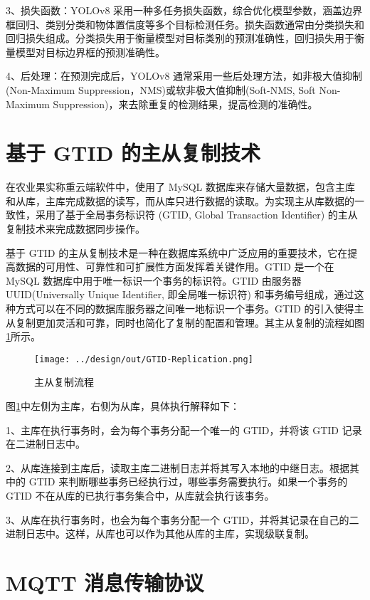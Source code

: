 3、损失函数：YOLOv8 采用一种多任务损失函数，综合优化模型参数，涵盖边界框回归、类别分类和物体置信度等多个目标检测任务\cite{Liu2023-yolov8}。损失函数通常由分类损失和回归损失组成。分类损失用于衡量模型对目标类别的预测准确性，回归损失用于衡量模型对目标边界框的预测准确性。

4、后处理：在预测完成后，YOLOv8 通常采用一些后处理方法，如非极大值抑制(Non-Maximum Suppression，NMS)或软非极大值抑制(Soft-NMS, Soft Non-Maximum Suppression)\cite{SuperYOLO8}，来去除重复的检测结果，提高检测的准确性。

\section{基于 GTID 的主从复制技术}\label{sec:gtid}

在农业果实称重云端软件中，使用了 MySQL 数据库来存储大量数据，包含主库和从库，主库完成数据的读写，而从库只进行数据的读取。为实现主从库数据的一致性，采用了基于全局事务标识符 (GTID, Global Transaction Identifier) 的主从复制技术来完成数据同步操作。

基于 GTID 的主从复制技术是一种在数据库系统中广泛应用的重要技术，它在提高数据的可用性、可靠性和可扩展性方面发挥着关键作用。GTID 是一个在 MySQL 数据库中用于唯一标识一个事务的标识符。GTID 由服务器 UUID(Universally Unique Identifier, 即全局唯一标识符) 和事务编号组成，通过这种方式可以在不同的数据库服务器之间唯一地标识一个事务。GTID 的引入使得主从复制更加灵活和可靠，同时也简化了复制的配置和管理。其主从复制的流程如图\ref{fig:GTID-Replication}所示。

\begin{figure}[H]
    \centering
    \texttt{[image: ../design/out/GTID-Replication.png]}
    \caption{主从复制流程}
    \label{fig:GTID-Replication}
\end{figure}

图\ref{fig:GTID-Replication}中左侧为主库，右侧为从库，具体执行解释如下：

1、主库在执行事务时，会为每个事务分配一个唯一的 GTID，并将该 GTID 记录在二进制日志中。

2、从库连接到主库后，读取主库二进制日志并将其写入本地的中继日志。根据其中的 GTID 来判断哪些事务已经执行过，哪些事务需要执行。如果一个事务的 GTID 不在从库的已执行事务集合中，从库就会执行该事务。

3、从库在执行事务时，也会为每个事务分配一个 GTID，并将其记录在自己的二进制日志中。这样，从库也可以作为其他从库的主库，实现级联复制\cite{MySQL-Liu2022}。

\section{MQTT 消息传输协议}\label{sec:mqtt}

